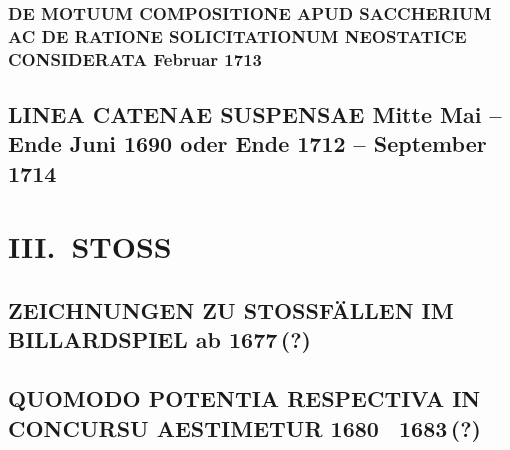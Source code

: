 \documentclass[%
fontsize=10pt,
]{scrbook}
\DeclareRobustCommand{\bracks}[1]{%
\textup{\lbrack}#1\textup{\rbrack}}
\begin{document}
\section[tocentry={De motuum compositione apud Saccherium ac de ratione solicitationum Neostatice considerata
\enskip Februar 1713%
},
head={De ratione solicitationum Neostatice considerata}]
{\MakeUppercase{De motuum compositione apud Saccherium ac de ratione solicitationum Neostatice considerata}
\newline Februar 1713%
}
\label{60122}







\chapter[tocentry={Linea catenae suspensae
\enskip\bracks{%
Mitte Mai -- Ende Juni 1690  oder  Ende 1712 -- September 1714%
}}, %
head={Linea catenae suspensae}]%
{\MakeUppercase{Linea catenae suspensae}
\newline\bracks{%
Mitte Mai -- Ende Juni 1690  oder  Ende 1712 -- September 1714}}%
\label{60128}













\part{III.~STOSS} 




\chapter[tocentry={Zeichnungen zu Stoßfällen im Billardspiel
\enskip \bracks{ab 1677\,(?)}},
head={Zeichnungen zu Stoßfällen im Billardspiel}]%
{\MakeUppercase{Zeichnungen zu Stoßfällen im Billardspiel} 
\newline \bracks{ab 1677\,(?)}}
\label{60221-B}




\chapter[tocentry={Quomodo potentia respectiva in concursu aestimetur
\enskip\bracks{1680 \textendash\ 1683\,(?)}},
head={Quomodo potentia respectiva aestimetur}]%
{\MakeUppercase{Quomodo potentia respectiva in concursu aestimetur}
\newline\bracks{1680 \textendash\ 1683\,(?)}}
\label{60243}

\end{document}
